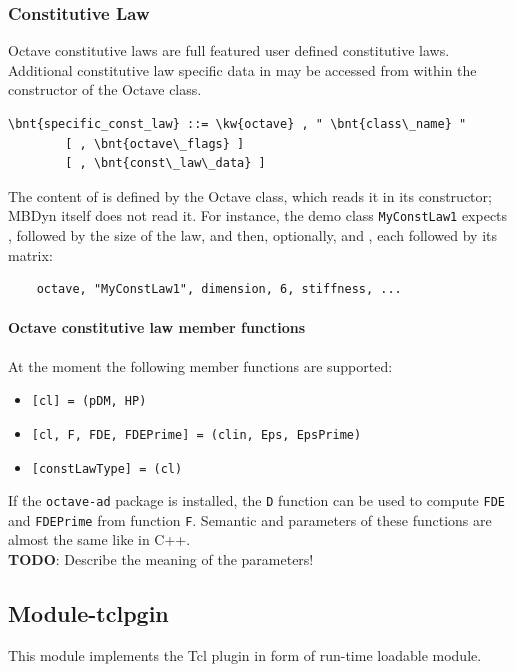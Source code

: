 \subsubsection{Constitutive Law}
Octave constitutive laws are full featured user defined constitutive laws.
Additional constitutive law specific data in  may be accessed from within the constructor of the Octave class.
\begin{Verbatim}[commandchars=\\\{\}]
    \bnt{specific_const_law} ::= \kw{octave} , " \bnt{class\_name} "
        [ , \bnt{octave\_flags} ]
        [ , \bnt{const\_law\_data} ]
\end{Verbatim}
The content of  is defined by the Octave class,
which reads it in its constructor; MBDyn itself does not read it.
For instance, the demo class \texttt{MyConstLaw1} expects
, followed by the size of the law,
and then, optionally,  and ,
each followed by its matrix:
\begin{verbatim}
    octave, "MyConstLaw1", dimension, 6, stiffness, ...
\end{verbatim}

\paragraph{Octave constitutive law member functions}
At the moment the following member functions are supported:
\begin{itemize}
\item \verb![cl] = !\verb!(pDM, HP) !
\item \verb![cl, F, FDE, FDEPrime] = !\verb!(clin, Eps, EpsPrime) !
\item \verb![constLawType] = !\verb!(cl) !
\end{itemize}
If the \texttt{octave-ad} package is installed, the \texttt{D} function
can be used to compute \texttt{FDE} and \texttt{FDEPrime}
from function \texttt{F}.
Semantic and parameters of these functions are almost the same like in C++. \\
\textbf{TODO}: Describe the meaning of the parameters!

\subsection{Module-tclpgin}
This module implements the Tcl plugin in form of run-time loadable module.
 
